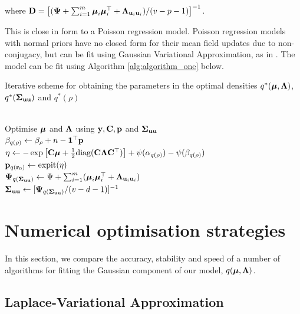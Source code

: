 \documentclass[times, doublespace]{anzsauth}
\begin{document}
\noindent where ${\bf D} = \left[ ({\boldsymbol \Psi} + \sum_{i=1}^m {\boldsymbol \mu}_i {\boldsymbol \mu}_i^\top + {\boldsymbol \Lambda}_{{\bf u}_i{\bf u}_i}) / (v - p - 1) \right]^{-1}$. 

\noindent This is close in form to a Poisson regression model. Poisson regression models with normal priors
have no closed form for their mean field updates due to non- conjugacy, but can be fit using Gaussian
Variational Approximation, as in \cite{ormerod09}. The model can be fit using Algorithm
\ref{alg:algorithm_one} below.

\begin{algorithm}
	\caption[Algorithm 1]{Iterative scheme for obtaining the parameters in the
		optimal densities $q^*({\boldsymbol \mu}, {\boldsymbol \Lambda})$, $q^*({\boldsymbol \Sigma}_{{\bf u} {\bf u}})$ and $q^*(\rho)$}
	\label{alg:algorithm_one}
	\begin{algorithmic}
		 \\[1ex]
		\STATE Optimise ${\boldsymbol \mu}$ and ${\boldsymbol \Lambda}$ using ${\bf y}, {\bf C}, {\bf p}$ and ${\boldsymbol \Sigma}_{{\bf u} {\bf u}}$ \\[1ex]
		\STATE $\beta_{q(\rho)} \leftarrow \beta_\rho + n - {\bf 1}^\top{\bf p}$ \\[1ex]
		\STATE $\eta \leftarrow -\exp \left [ {\bf C} {\boldsymbol \mu} + \tfrac{1}{2} \text{diag}{({\bf C}{\boldsymbol\Lambda}{\bf C}^\top)} \right ] + \psi{(\alpha_{q{(\rho)}})} - \psi{(\beta_{q{(\rho)}})}$ \\[1ex]
			\STATE ${\bf p}_{q({\bf r}_0)} \leftarrow \text{expit} (\eta)$ \\[1ex]
			\STATE ${\boldsymbol \Psi}_{q({\boldsymbol \Sigma}_{{\bf u} {\bf u}})} \leftarrow \Psi + \sum_{i=1}^m ({\boldsymbol \mu}_i {\boldsymbol \mu}_i^\top + {\boldsymbol \Lambda}_{{{\bf u}}_i {{\bf u}}_i})$ \\[1ex]
			\STATE ${\boldsymbol \Sigma}_{{\bf u}{\bf u}} \leftarrow [{\boldsymbol \Psi}_{q({\boldsymbol \Sigma}_{{\bf u} {\bf u}})}/(v - d - 1)]^{-1}$
			\ENDWHILE
		\end{algorithmic}
	\end{algorithm}
	
	\section{Numerical optimisation strategies}
	\label{sec:algorithms}
	
	In this section, we compare the accuracy, stability and speed of a number of algorithms for fitting the
	Gaussian component of our model, $q({\boldsymbol \mu}, {\boldsymbol \Lambda})$.
	
	
	\subsection{Laplace-Variational Approximation}
	
\end{document}
